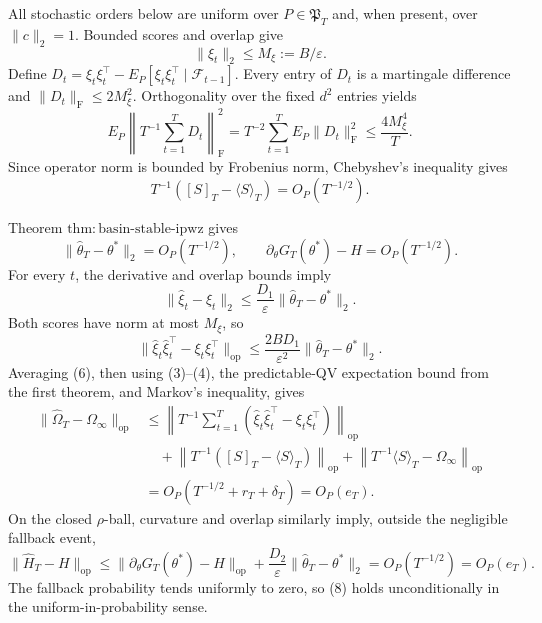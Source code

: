 All stochastic orders below are uniform over \(P\in\mathfrak P_T\) and, when present, over \(\|c\|_2=1\). Bounded scores and overlap give
\[
 \|\xi_t\|_2\le M_\xi:=B/\varepsilon. \tag{1}
\]
Define \(D_t=\xi_t\xi_t^\top-E_P[\xi_t\xi_t^\top\mid\mathcal F_{t-1}]\). Every entry of \(D_t\) is a martingale difference and \(\|D_t\|_{\mathrm F}\le2M_\xi^2\). Orthogonality over the fixed \(d^2\) entries yields
\[
 E_P\left\|T^{-1}\sum_{t=1}^TD_t\right\|_{\mathrm F}^2
 =T^{-2}\sum_{t=1}^TE_P\|D_t\|_{\mathrm F}^2
 \le\frac{4M_\xi^4}{T}. \tag{2}
\]
Since operator norm is bounded by Frobenius norm, Chebyshev's inequality gives
\[
 T^{-1}([S]_T-\langle S\rangle_T)=O_P(T^{-1/2}). \tag{3}
\]

Theorem \(\mathrm{thm:basin\text{-}stable\text{-}ipwz}\) gives
\[
 \|\widehat\theta_T-\theta^*\|_2=O_P(T^{-1/2}),
 \qquad \partial_\theta G_T(\theta^*)-H=O_P(T^{-1/2}). \tag{4}
\]
For every \(t\), the derivative and overlap bounds imply
\[
 \|\widehat\xi_t-\xi_t\|_2
 \le\frac{D_1}{\varepsilon}\|\widehat\theta_T-\theta^*\|_2. \tag{5}
\]
Both scores have norm at most \(M_\xi\), so
\[
 \|\widehat\xi_t\widehat\xi_t^\top-\xi_t\xi_t^\top\|_{\mathrm{op}}
 \le\frac{2BD_1}{\varepsilon^2}\|\widehat\theta_T-\theta^*\|_2. \tag{6}
\]
Averaging (6), then using (3)--(4), the predictable-QV expectation bound from the first theorem, and Markov's inequality, gives
\[
\begin{aligned}
 \|\widehat\Omega_T-\Omega_\infty\|_{\mathrm{op}}
 &\le\left\|T^{-1}\sum_{t=1}^T
 (\widehat\xi_t\widehat\xi_t^\top-\xi_t\xi_t^\top)\right\|_{\mathrm{op}}\\
 &\quad+\left\|T^{-1}([S]_T-\langle S\rangle_T)\right\|_{\mathrm{op}}
 +\left\|T^{-1}\langle S\rangle_T-\Omega_\infty\right\|_{\mathrm{op}}\\
 &=O_P(T^{-1/2}+r_T+\delta_T)=O_P(e_T).
\end{aligned}\tag{7}
\]
On the closed \(\rho\)-ball, curvature and overlap similarly imply, outside the negligible fallback event,
\[
 \|\widehat H_T-H\|_{\mathrm{op}}
 \le\|\partial_\theta G_T(\theta^*)-H\|_{\mathrm{op}}
 +\frac{D_2}{\varepsilon}\|\widehat\theta_T-\theta^*\|_2
 =O_P(T^{-1/2})=O_P(e_T). \tag{8}
\]
The fallback probability tends uniformly to zero, so (8) holds unconditionally in the uniform-in-probability sense.

